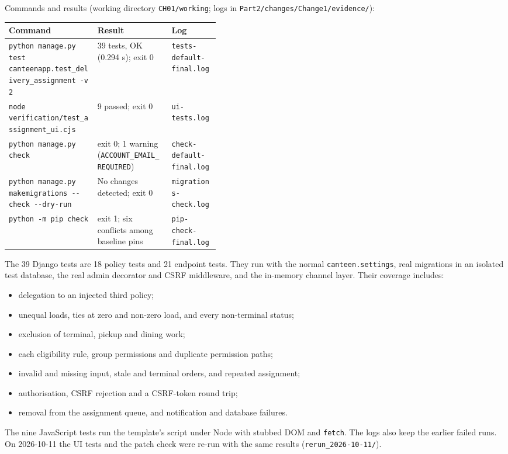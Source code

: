 \documentclass[11pt,a4paper]{article}
\newcommand{\code}[1]{\nolinkurl{#1}}
\begin{document}
Commands and results (working directory \code{CH01/working}; logs in \code{Part2/changes/Change1/evidence/}):

\begin{tabularx}{\linewidth}{@{}p{0.42\linewidth}Xl@{}}\toprule
Command & Result & Log\\\midrule
\code{python manage.py test canteenapp.test_delivery_assignment -v 2} & 39 tests, OK (0.294 s); exit 0 & \code{tests-default-final.log}\\
\code{node verification/test_assignment_ui.cjs} & 9 passed; exit 0 & \code{ui-tests.log}\\
\code{python manage.py check} & exit 0; 1 warning (\code{ACCOUNT_EMAIL_REQUIRED}) & \code{check-default-final.log}\\
\code{python manage.py makemigrations --check --dry-run} & No changes detected; exit 0 & \code{migrations-check.log}\\
\code{python -m pip check} & exit 1; six conflicts among baseline pins & \code{pip-check-final.log}\\\bottomrule
\end{tabularx}

The 39 Django tests are 18 policy tests and 21 endpoint tests. They run with the normal \code{canteen.settings}, real migrations in an isolated test database, the real admin decorator and CSRF middleware, and the in-memory channel layer. Their coverage includes:
\begin{itemize}
\item delegation to an injected third policy;
\item unequal loads, ties at zero and non-zero load, and every non-terminal status;
\item exclusion of terminal, pickup and dining work;
\item each eligibility rule, group permissions and duplicate permission paths;
\item invalid and missing input, stale and terminal orders, and repeated assignment;
\item authorisation, CSRF rejection and a CSRF-token round trip;
\item removal from the assignment queue, and notification and database failures.
\end{itemize}
The nine JavaScript tests run the template's script under Node with stubbed DOM and \code{fetch}. The logs also keep the earlier failed runs. On 2026-10-11 the UI tests and the patch check were re-run with the same results (\code{rerun_2026-10-11/}).
\end{document}
